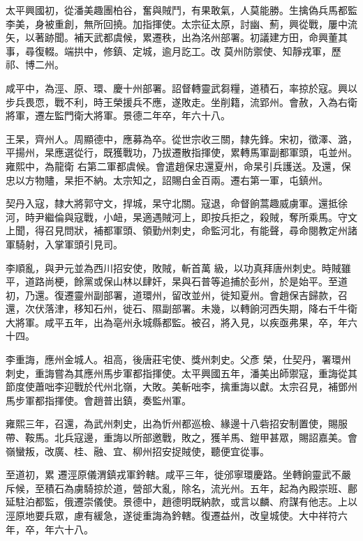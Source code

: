 \begin{pinyinscope}
 太平興國初，從潘美趣團柏谷，奮與賊鬥，有果敢氣，人莫能勝。生擒偽兵馬都監李美，身被重創，無所回撓。加指揮使。太宗征太原，討幽、薊，興從戰，屢中流矢，以著跡聞。補天武都虞候，累遷秩，出為洺州部署。初議建方田，命興董其事，尋復輟。端拱中，修鎮、定城，逾月訖工。改
 莫州防禦使、知靜戎軍，歷祁、博二州。



 咸平中，為涇、原、環、慶十州部署。詔督轉靈武芻糧，道積石，率掠於寇。興以步兵畏恧，戰不利，時王榮援兵不應，遂敗走。坐削籍，流郢州。會赦，入為右衛將軍，遷左監門衛大將軍。景德二年卒，年六十八。



 王杲，齊州人。周顯德中，應募為卒。從世宗收三關，隸先鋒。宋初，徵澤、潞，平揚州，杲應選從行，既獲戰功，乃拔遷散指揮使，累轉馬軍副都軍頭，屯並州。雍熙中，為龍衛
 右第二軍都虞候。會遣趙保忠還夏州，命杲引兵護送。及還，保忠以方物贐，杲拒不納。太宗知之，詔賜白金百兩。遷右第一軍，屯鎮州。



 契丹入寇，隸大將郭守文，捍城，杲守北關。寇退，命督餉蒿趣威虜軍。還抵徐河，時尹繼倫與寇戰，小衄，杲適遇賊河上，即按兵拒之，殺賊，奪所乘馬。守文上聞，得召見問狀，補都軍頭、領勤州刺史，命監河北，有能聲，尋命閱教定州諸軍騎射，入掌軍頭引見司。



 李順亂，與尹元並為西川招安使，敗賊，斬首萬
 級，以功真拜唐州刺史。時賊雖平，道路尚梗，餘黨或保山林以肆奸，杲與石普等追捕於彭州，於是始平。至道初，乃還。復遷靈州副部署，道環州，留改並州，徙知夏州。會趙保吉歸款，召還，次伏落津，移知石州，徙石、隰副部署。未幾，以轉餉河西失期，降右千牛衛大將軍。咸平五年，出為亳州永城縣都監。被召，將入見，以疾亟弗果，卒，年六十四。



 李重誨，應州金城人。祖高，後唐莊宅使、獎州刺史。父彥
 榮，仕契丹，署環州刺史，重誨嘗為其應州馬步軍都指揮使。太平興國五年，潘美出師禦寇，重誨從其節度使蕭咄李迎戰於代州北嶺，大敗。美斬咄李，擒重誨以獻。太宗召見，補鄧州馬步軍都指揮使。會趙普出鎮，奏監州軍。



 雍熙三年，召還，為武州刺史，出為忻州都巡檢、緣邊十八砦招安制置使，賜服帶、鞍馬。北兵寇邊，重誨以所部邀戰，敗之，獲羊馬、鎧甲甚眾，賜詔嘉美。會嶺蠻叛，改廣、桂、融、宜、柳州招安捉賊使，聽便宜從事。



 至道初，累
 遷涇原儀渭鎮戎軍鈐轄。咸平三年，徙邠寧環慶路。坐轉餉靈武不嚴斥候，至積石為虜騎掠於道，營部大亂，除名，流光州。五年，起為內殿崇班、鄜延駐泊都監，俄遷崇儀使。景德中，趙德明既納款，或言以麟、府謀有他志。上以涇原地要兵眾，慮有緩急，遂徙重誨為鈐轄。復遷益州，改皇城使。大中祥符六年，卒，年六十八。




\end{pinyinscope}
